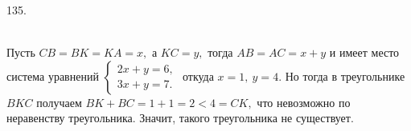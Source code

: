 135. \begin{figure}[ht!]
\end{figure}\\
Пусть $CB=BK=KA=x,$ а $KC=y,$ тогда $AB=AC=x+y$ и имеет место система уравнений $\begin{cases} 2x+y=6,\\ 3x+y=7.\end{cases}$ откуда $x=1,\ y=4.$ Но тогда в треугольнике $BKC$ получаем $BK+BC=1+1=2<4=CK,$ что невозможно по неравенству треугольника. Значит, такого треугольника не существует.\\
